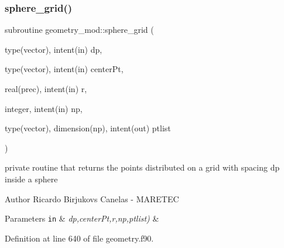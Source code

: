 \subsubsection{\texorpdfstring{sphere\+\_\+grid()}{sphere\_grid()}}
{\footnotesize\ttfamily subroutine geometry\+\_\+mod\+::sphere\+\_\+grid (\begin{DoxyParamCaption}\item[{type(vector), intent(in)}]{dp,  }\item[{type(vector), intent(in)}]{center\+Pt,  }\item[{real(prec), intent(in)}]{r,  }\item[{integer, intent(in)}]{np,  }\item[{type(vector), dimension(np), intent(out)}]{ptlist }\end{DoxyParamCaption})\hspace{0.3cm}{\ttfamily [private]}}



private routine that returns the points distributed on a grid with spacing dp inside a sphere 

\begin{DoxyAuthor}{Author}
Ricardo Birjukovs Canelas -\/ M\+A\+R\+E\+T\+EC 
\end{DoxyAuthor}

\begin{DoxyParams}[1]{Parameters}
\mbox{\tt in}  & {\em dp,center\+Pt,r,np,ptlist)} & \\
\hline
\end{DoxyParams}


Definition at line 640 of file geometry.\+f90.


